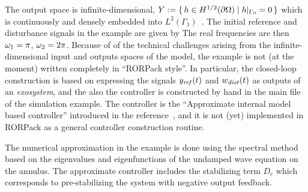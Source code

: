\documentclass[11pt, a4paper]{amsart}
\theoremstyle{definition}
\numberwithin{equation}{section}
\newcommand{\yref}{y_{\mbox{\scriptsize\textit{ref}}}}
\newcommand{\wdist}{w_{\mbox{\scriptsize\textit{dist}}}}
\begin{document}
  The output space is infinite-dimensional,  $Y :=  \{\,h\in H^{1/2}(\partial\Omega)\mid h\vert_{\Gamma_0}=0\,\}$ which is continuously and densely embedded into $L^2(\Gamma_1)$~. 
The initial reference and disturbance signals in the example are given by
  The real frequencies are then $\omega_1=\pi$, $ \omega_2=2\pi$.
Because of of the technical challenges arising from the infinite-dimensional input and outputs spaces of the model, the example is not (at the moment) written completely in ``RORPack style''. In particular, the closed-loop construction is based on expressing the signals $\yref(t)$ and $\wdist(t)$ as outputs of an \emph{exosystem}, and the also the controller is constructed by hand in the main file of the simulation example. The controller is the ``Approximate internal model based controller'' introduced in the reference~\cite{HumKur19}, and it is not (yet) implemented in RORPack as a general controller construction routine.

  The numerical approximation in the example is done using the spectral method based on the eigenvalues and eigenfunctions of the undamped wave equation on the annulus. The approximate controller includes the stabilizing term $D_c$ which corresponds to pre-stabilizing the system with negative output feedback. 
\end{document}
